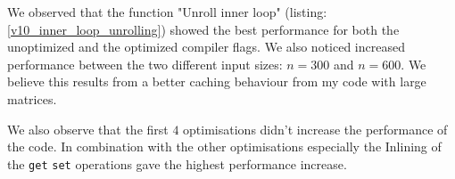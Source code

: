 \documentclass[portrait,a4paper]{article}
\begin{document}
We observed that the function "Unroll inner loop" (listing: \ref{v10_inner_loop_unrolling}) showed the best performance for both the unoptimized and the optimized compiler flags. We also noticed increased performance between the two different input sizes: $n=300$ and $n=600$. We believe this results from a better caching behaviour from my code with large matrices.

We also observe that the first $4$ optimisations didn't increase the performance of the code. In combination with the other optimisations especially the Inlining of the \lstinline{get} \lstinline{set} operations gave the highest performance increase.
\end{document}
